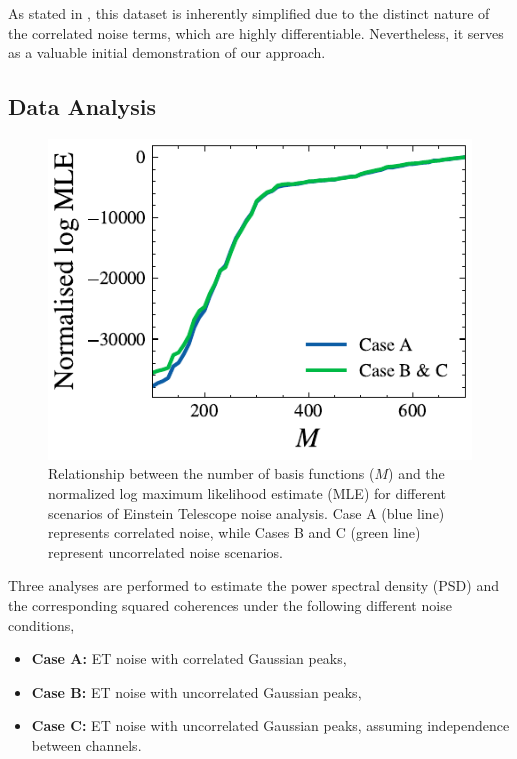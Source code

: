 \documentclass[%
 reprint,
 amsmath,amssymb,
 aps,
 nofootinbib,
]{revtex4-2}
\begin{document}
As stated in \citet{JanssensKamiel2023Ffps}, this dataset is inherently simplified due to the distinct nature of the correlated noise terms, which are highly differentiable. 
Nevertheless, it serves as a valuable initial demonstration of our approach. 

\subsection{Data Analysis}


\begin{figure}[!t]
\centering
  \includegraphics[width=\columnwidth]{et_basis_fns.pdf}
  \caption{Relationship between the number of basis functions ($M$) and the normalized log maximum likelihood estimate (MLE) for different scenarios of Einstein Telescope noise analysis. Case A (blue line) represents correlated noise, while Cases B and C (green line) represent uncorrelated noise scenarios.
  }
  \label{et_corr_basis_funs_vs_mle}
\end{figure}


Three analyses are performed to estimate the power spectral density (PSD) and the corresponding squared coherences under the following different noise conditions, 
\begin{itemize}
\setlength{\itemindent}{-15pt}
    \item[] \textbf{Case A:}  ET noise with correlated Gaussian peaks,
    \item[] \textbf{Case B:} ET noise with uncorrelated Gaussian peaks,
    \item[] \textbf{Case C:} ET noise with uncorrelated Gaussian peaks, assuming independence between channels.
\end{itemize}
\end{document}
